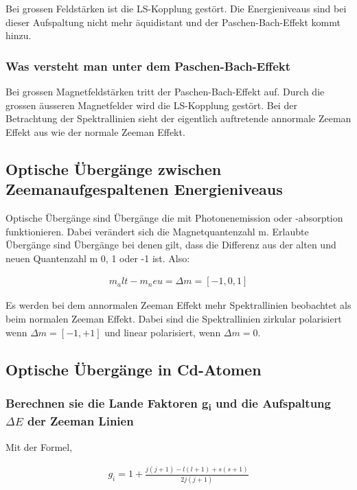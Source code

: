 \noindent Bei grossen Feldstärken ist die LS-Kopplung gestört. Die Energieniveaus sind bei dieser Aufspaltung nicht mehr äquidistant und der Paschen-Bach-Effekt kommt hinzu.

\subsubsection{Was versteht man unter dem Paschen-Bach-Effekt}

Bei grossen Magnetfeldstärken tritt der Paschen-Bach-Effekt auf. Durch die grossen äusseren Magnetfelder wird die LS-Kopplung gestört. Bei der Betrachtung der Spektrallinien sieht der eigentlich auftretende annormale Zeeman Effekt aus wie der normale Zeeman Effekt.

\subsection{Optische Übergänge zwischen Zeemanaufgespaltenen Energieniveaus}

Optische Übergänge sind Übergänge die mit Photonenemission oder -absorption funktionieren. Dabei verändert sich die Magnetquantenzahl m. Erlaubte Übergänge sind Übergänge bei denen gilt, dass die Differenz aus der alten und neuen Quantenzahl m 0, 1 oder -1 ist. Also:

\begin{align}
    m_alt - m_neu = \Delta m = [-1,0,1]
\end{align}

\noindent Es werden bei dem annormalen Zeeman Effekt mehr Spektrallinien beobachtet als beim normalen Zeeman Effekt. Dabei sind die Spektrallinien zirkular polarisiert wenn $\Delta m =  [-1,+1]$ und linear polarisiert, wenn $\Delta m = 0 $.   

\subsection{Optische Übergänge in Cd-Atomen}

\subsubsection{Berechnen sie die Lande Faktoren g\textsubscript{i} und die Aufspaltung $\Delta E$ der Zeeman Linien}

Mit der Formel,

\begin{align}
    g_i = 1 + \frac{j(j + 1) - l(l+1) + s(s+1)}{2j(j+1)}
\end{align}

